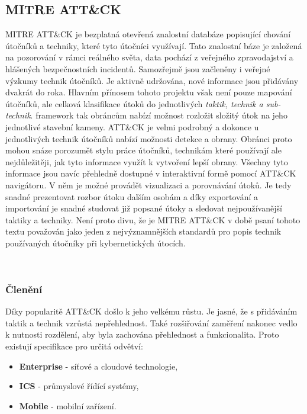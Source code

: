\subsection{MITRE ATT\&CK}\label{subsec:mitre-att&ck}
MITRE ATT\&CK je bezplatná otevřená znalostní databáze popisující chování útočníků a techniky, které tyto útočníci využívají.
Tato znalostní báze je založená na pozorování v rámci reálného světa, data pochází z veřejného zpravodajství a hlášených bezpečnostních incidentů.
Samozřejmě jsou začleněny i veřejné výzkumy technik útočníků.
Je aktivně udržována, nové informace jsou přidávány dvakrát do roka\cite{mitre_attack_framework_faq}.
Hlavním přínosem tohoto projektu však není pouze mapování útočníků, ale celková klasifikace útoků do jednotlivých \textit{taktik, technik a sub-technik}.
framework tak obráncům nabízí možnost rozložit složitý útok na jeho jednotlivé stavební kameny.
ATT\&CK je velmi podrobný a dokonce u jednotlivých technik útočníků nabízí možnosti detekce a obrany.
Obránci proto mohou snáze porozumět stylu práce útočníků, technikám které používají ale nejdůležitěji, jak tyto informace využít k vytvoření lepší obrany.
Všechny tyto informace jsou navíc přehledně dostupné v interaktivní formě pomocí ATT\&CK navigátoru\cite{mitre_attack_navigator}.
V něm je možné provádět vizualizaci a porovnávání útoků.
Je tedy snadné prezentovat rozbor útoku dalším osobám a díky exportování a importování je snadné studovat již popsané útoky a sledovat nejpoužívanější taktiky a techniky.
Není proto divu, že je MITRE ATT\&CK v době psaní tohoto textu považován jako jeden z nejvýznamnějších standardů pro popis technik používaných útočníky při kybernetických útocích.\cite{mitre_attack_framework}

~

\subsubsection{Členění}
Díky popularitě ATT\&CK došlo k jeho velkému růstu.
Je jasné, že s přidáváním taktik a technik vzrůstá nepřehlednost.
Také rozšiřování zaměření nakonec vedlo k nutnosti rozdělení, aby byla zachována přehlednost a funkcionalita.
Proto existují specifikace pro určitá odvětví:

\begin{itemize}
	\item \textbf{Enterprise} - síťové a cloudové technologie,
	\item \textbf{ICS} - průmyslové řídící systémy,
	\item \textbf{Mobile} - mobilní zařízení.
\end{itemize}

